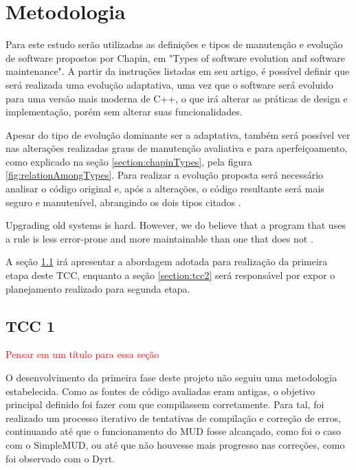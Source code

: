 \chapter[Metodologia]{Metodologia}

Para este estudo serão utilizadas as definições e tipos de manutenção e evolução de software 
propostos por Chapin, em "Types of software evolution and software maintenance". 
A partir da instruções listadas em seu artigo, é possível definir que será realizada uma evolução 
adaptativa, uma vez que o software será evoluido para uma versão mais moderna de C++, o que irá 
alterar as práticas de design e implementação, porém sem alterar suas funcionalidades.

Apesar do tipo de evolução dominante ser a adaptativa, também será possível ver nas alterações realizadas 
graus de manutenção avaliativa e para aperfeiçoamento, como explicado na seção \ref{section:chapinTypes}, 
pela figura \ref{fig:relationAmongTypes}. Para realizar a evolução proposta será necessário analisar o 
código original e, após a alterações, o código resultante será mais seguro e manutenível, abrangindo 
os dois tipos citados \cite{chapin2001types}.

\begin{citacao}
    Upgrading old systems is hard. However, we do believe that a program that uses a rule is less error-prone and more maintainable than one that does not \cite{stroustrup2022c++}.
\end{citacao}

A seção \ref{section:tcc1} irá apresentar a abordagem adotada para realização da primeira etapa deste TCC, 
enquanto a seção \ref{section:tcc2} será responsável por expor o planejamento realizado para segunda etapa.

\section{TCC 1}
\label{section:tcc1}

\textcolor{red}{Pensar em um título para essa seção}

O desenvolvimento da primeira fase deste projeto não seguiu uma metodologia estabelecida. Como as fontes 
de código avaliadas eram antigas, o objetivo principal definido foi fazer com que compilassem 
corretamente. Para tal, foi realizado um processo iterativo de tentativas de compilação e correção de 
erros, continuando até que o funcionamento do MUD fosse alcançado, como foi o caso com o SimpleMUD, ou 
até que não houvesse mais progresso nas correções, como foi observado com o Dyrt.

